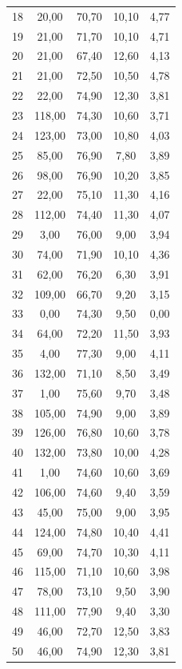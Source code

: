 \documentclass[
    12pt,                %
    openright,           %
    oneside,             %
    a4paper,             %
    english,             %
    spanish,             %
    brazil               %
]{ufscar}
\begin{document}
\begin{apendicesenv}
\begin{longtable}{c c c c c}
18 & 20,00  & 70,70 & 10,10 & 4,77 \\ 
19 & 21,00  & 71,70 & 10,10 & 4,71 \\ 
20 & 21,00  & 67,40 & 12,60 & 4,13 \\ 
21 & 21,00  & 72,50 & 10,50 & 4,78 \\ 
22 & 22,00  & 74,90 & 12,30 & 3,81 \\ 
23 & 118,00 & 74,30 & 10,60 & 3,71 \\ 
24 & 123,00 & 73,00 & 10,80 & 4,03 \\ 
25 & 85,00  & 76,90 & 7,80  & 3,89 \\ 
26 & 98,00  & 76,90 & 10,20 & 3,85 \\ 
27 & 22,00  & 75,10 & 11,30 & 4,16 \\ 
28 & 112,00 & 74,40 & 11,30 & 4,07 \\ 
29 & 3,00   & 76,00 & 9,00  & 3,94 \\ 
30 & 74,00  & 71,90 & 10,10 & 4,36 \\ 
31 & 62,00  & 76,20 & 6,30  & 3,91 \\ 
32 & 109,00 & 66,70 & 9,20  & 3,15 \\ 
33 & 0,00   & 74,30 & 9,50  & 0,00 \\ 
34 & 64,00  & 72,20 & 11,50 & 3,93 \\ 
35 & 4,00   & 77,30 & 9,00  & 4,11 \\ 
36 & 132,00 & 71,10 & 8,50  & 3,49 \\ 
37 & 1,00   & 75,60 & 9,70  & 3,48 \\ 
38 & 105,00 & 74,90 & 9,00  & 3,89 \\ 
39 & 126,00 & 76,80 & 10,60 & 3,78 \\ 
40 & 132,00 & 73,80 & 10,00 & 4,28 \\ 
41 & 1,00   & 74,60 & 10,60 & 3,69 \\ 
42 & 106,00 & 74,60 & 9,40  & 3,59 \\ 
43 & 45,00  & 75,00 & 9,00  & 3,95 \\ 
44 & 124,00 & 74,80 & 10,40 & 4,41 \\ 
45 & 69,00  & 74,70 & 10,30 & 4,11 \\ 
46 & 115,00 & 71,10 & 10,60 & 3,98 \\ 
47 & 78,00  & 73,10 & 9,50  & 3,90 \\ 
48 & 111,00 & 77,90 & 9,40  & 3,30 \\ 
49 & 46,00  & 72,70 & 12,50 & 3,83 \\ 
50 & 46,00  & 74,90 & 12,30 & 3,81 \\ 

\end{longtable}
\end{apendicesenv}
\end{document}
